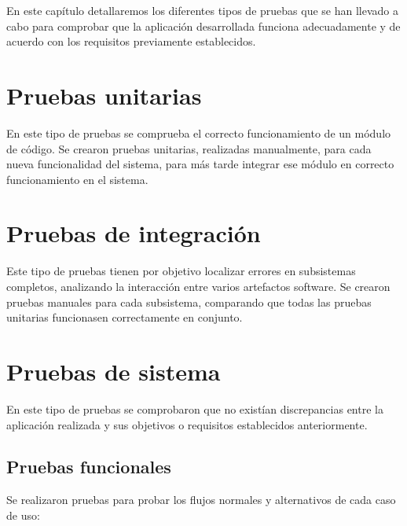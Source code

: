 

En este capítulo detallaremos los diferentes tipos de pruebas que se han llevado a cabo para comprobar que la aplicación desarrollada funciona adecuadamente y de acuerdo con los requisitos previamente establecidos. 

\section{Pruebas unitarias}

En este tipo de pruebas se comprueba el correcto funcionamiento de un módulo de código. Se crearon pruebas unitarias, realizadas manualmente, para cada nueva funcionalidad del sistema, para más tarde integrar ese módulo en correcto funcionamiento en el sistema.

\section{Pruebas de integración}

Este tipo de pruebas tienen por objetivo localizar errores en subsistemas completos, analizando la interacción entre varios artefactos software. Se crearon pruebas manuales para cada subsistema, comparando que todas las pruebas unitarias funcionasen correctamente en conjunto.

\section{Pruebas de sistema}

En este tipo de pruebas se comprobaron que no existían discrepancias entre la aplicación realizada y sus objetivos o requisitos establecidos anteriormente.

\subsection{Pruebas funcionales}

Se realizaron pruebas para probar los flujos normales y alternativos de cada caso de uso:\\

